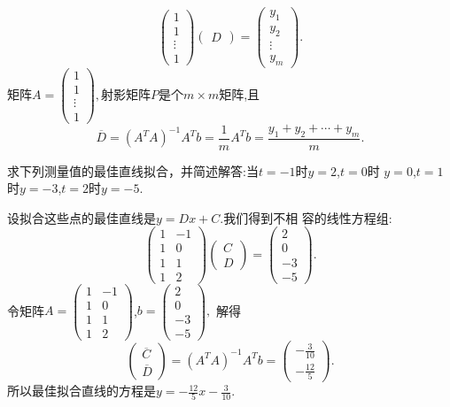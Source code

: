 ﻿\documentclass{book} \usepackage{exsheets} \usepackage{xeCJK}
\begin{document}
\begin{solution}
$$
\begin{pmatrix}
  1\\
1\\
\vdots\\
1
\end{pmatrix}
\begin{pmatrix}
  D
\end{pmatrix}=
\begin{pmatrix}
  y_1\\
y_2\\
\vdots\\
y_m
\end{pmatrix}.
$$
矩阵$A=
\begin{pmatrix}
  1\\
1\\
\vdots\\
1
\end{pmatrix},
$射影矩阵$P$是个$m\times m$矩阵,且
$$
\overline{D}=(A^TA)^{-1}A^Tb=\frac{1}{m}A^Tb=\frac{y_1+y_{2}+\cdots+y_{m}}{m}.
$$
\end{solution}
\begin{question}
  求下列测量值的最佳直线拟合，并简述解答:当$t=-1$时$y=2$,$t=0$时
  $y=0$,$t=1$时$y=-3$,$t=2$时$y=-5$.
\end{question}
\begin{solution}
  设拟合这些点的最佳直线是$y=Dx+C$.我们得到不相
  容的线性方程组:
$$
\begin{pmatrix}
  1&-1\\
  1&0\\
  1&1\\
  1&2
\end{pmatrix}
\begin{pmatrix}
  C\\
D
\end{pmatrix}=
\begin{pmatrix}
  2\\
0\\
-3\\
-5
\end{pmatrix}.
$$
令矩阵$A=
\begin{pmatrix}
  1&-1\\
  1&0\\
  1&1\\
  1&2
\end{pmatrix}
$,$b=
\begin{pmatrix}
  2\\
0\\
-3\\
-5
\end{pmatrix},
$
解得
$$
\begin{pmatrix}
  \overline{C}\\
\overline{D}
\end{pmatrix}=(A^TA)^{-1}A^Tb=
\begin{pmatrix}
  -\frac{3}{10}\\
-\frac{12}{5}
\end{pmatrix}.
$$
所以最佳拟合直线的方程是$y=-\frac{12}{5}x-\frac{3}{10}$.
\end{solution}
\end{document}
